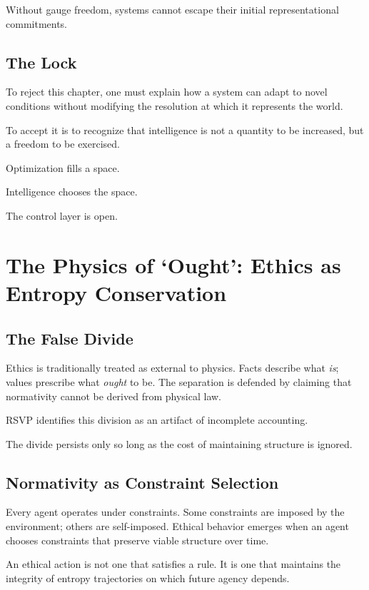 \documentclass[11pt]{book}
\begin{document}
Without gauge freedom, systems cannot escape their initial representational commitments.

\section{The Lock}

To reject this chapter, one must explain how a system can adapt to novel conditions without modifying the resolution at which it represents the world.

To accept it is to recognize that intelligence is not a quantity to be increased, but a freedom to be exercised.

Optimization fills a space.

Intelligence chooses the space.

The control layer is open.


\chapter{The Physics of `Ought': Ethics as Entropy Conservation}

\section{The False Divide}

Ethics is traditionally treated as external to physics. Facts describe what \emph{is}; values prescribe what \emph{ought} to be. The separation is defended by claiming that normativity cannot be derived from physical law.

RSVP identifies this division as an artifact of incomplete accounting.

The divide persists only so long as the cost of maintaining structure is ignored.

\section{Normativity as Constraint Selection}

Every agent operates under constraints. Some constraints are imposed by the environment; others are self-imposed. Ethical behavior emerges when an agent chooses constraints that preserve viable structure over time.

An ethical action is not one that satisfies a rule. It is one that maintains the integrity of entropy trajectories on which future agency depends.
\end{document}
